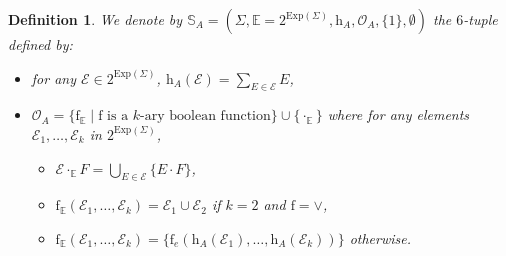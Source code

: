 \documentclass{article}
\newtheorem{definition}{Definition}
\begin{document}
     \begin{definition}\label{def support anti}
       We denote by $\mathbb{S}_A=(\Sigma,\mathbb{E}=2^{\mathrm{Exp}(\Sigma)},\mathrm{h}_A,\mathcal{O}_A,\{1\},\emptyset)$ the $6$-tuple defined by:
   \begin{itemize}
     \item for any $\mathcal{E}\in 2^{\mathrm{Exp}(\Sigma)}$, $\mathrm{h}_A(\mathcal{E})=\sum_{E\in\mathcal{E}} E$,
     \item $\mathcal{O}_A=\{\mathrm{f}_{\mathbb{E}}\mid \mathrm{f}\text{ is a } k\text{-ary boolean function}\}\cup\{\cdot_{\mathbb{E}}\}$ where for any elements $\mathcal{E}_1,\ldots,\mathcal{E}_k$  in $2^{\mathrm{Exp}(\Sigma)}$,
     \begin{itemize}
        \item $\mathcal{E} \cdot_{\mathbb{E}} F=\bigcup_{E\in\mathcal{E}} \{E\cdot F\}$,
        \item $\mathrm{f}_{\mathbb{E}}(\mathcal{E}_1,\ldots,\mathcal{E}_k)=\mathcal{E}_1\cup \mathcal{E}_2$ if $k=2$ and $\mathrm{f}=\vee$,
        \item $\mathrm{f}_{\mathbb{E}}(\mathcal{E}_1,\ldots,\mathcal{E}_k)=\{\mathrm{f}_e(\mathrm{h}_A(\mathcal{E}_1),\ldots,\mathrm{h}_A(\mathcal{E}_k))\}$ otherwise.
      \end{itemize}
    \end{itemize}
     \end{definition}
   
\end{document}
